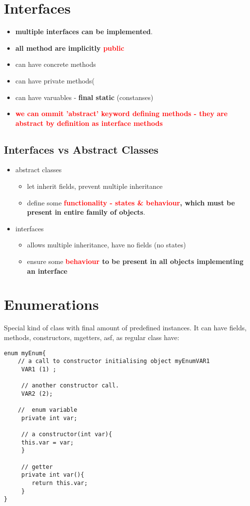 \documentclass{report}
\begin{document}
\chapter{Interfaces}
\begin{itemize}
	\item \textbf{multiple interfaces can be implemented}.
	\item \textbf{all method are implicitly \textcolor{red}{public}}
	\item can have concrete methods
	\item can have private methods(
	\item can have varuables - \textbf{final static} (constanses)
	\item \textbf{\textcolor{red}{we can ommit 'abstract' keyword defining methods - they are abstract by definition
	as interface methods}}
\end{itemize}

\section{Interfaces vs Abstract Classes}
\begin{itemize}
	\item abstract classes
	\begin{itemize}
		\item  let inherit fields, prevent multiple inheritance
		\item define some \textbf{\textcolor{red}{functionality - states \& behaviour}, which must be present in entire family of objects}.
	\end{itemize}
	\item interfaces
	\begin{itemize}
		\item  allows multiple inheritance, have no fields (no states)
		\item ensure some \textbf{\textcolor{red}{behaviour} to be present in all objects implementing an interface}
	\end{itemize}
	
\end{itemize}

\chapter{Enumerations}
Special kind of class with final amount of predefined instances. It can have fields, methods, constructors, mgetters, asf, as regular class have:
\begin{verbatim}
enum myEnum{
	// a call to constructor initialising object myEnumVAR1
	 VAR1 (1) ;
	 
	 // another constructor call.
	 VAR2 (2);
	 
	//  enum variable
	 private int var;
	 
	 // a constructor(int var){
	 this.var = var;
	 }
	 
	 // getter
	 private int var(){
	 	return this.var;
	 }
}
\end{verbatim}
\end{document}
